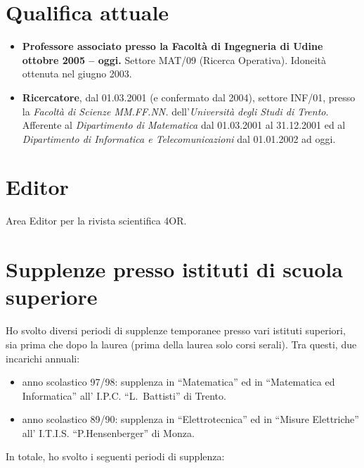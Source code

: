 \documentclass[11pt]{article}
\begin{document}
\section{Qualifica attuale}

\begin{itemize}
\item {\bf Professore associato presso la
          Facolt\`a di Ingegneria di Udine}
{\bf ottobre 2005 -- oggi.}
Settore MAT/09 (Ricerca Operativa).
Idoneit\`a ottenuta nel giugno 2003.


\item {\bf Ricercatore}, dal 01.03.2001 (e confermato dal 2004),
settore INF/01, presso la {\em Facolt\`a di Scienze MM.FF.NN.}
dell'{\em Universit\`a degli Studi di Trento}.
Afferente al {\em Dipartimento di Matematica} dal 01.03.2001 al
31.12.2001 ed al 
{\em Dipartimento di Informatica e Telecomunicazioni} dal 01.01.2002
ad oggi.

\end{itemize}


\section{Editor}

Area Editor per la rivista scientifica 4OR.


\section{Supplenze presso istituti di scuola superiore}

Ho svolto diversi periodi di supplenze temporanee
presso vari istituti superiori, sia prima che dopo la laurea
(prima della laurea solo corsi serali).
Tra questi, due incarichi annuali:
\begin{itemize}
   \item anno scolastico 97/98:
supplenza in ``Matematica'' ed in ``Matematica ed Informatica''
all' {{\sc I.P.C.} ``L.~Battisti''} 
di Trento.\\

   \vspace{-3.0mm}
   \item anno scolastico 89/90:
supplenza in ``Elettrotecnica'' ed in ``Misure Elettriche''
all' {{\sc I.T.I.S.} ``P.Hensenberger''}
di Monza.\\
\end{itemize} 

In totale,
ho svolto i seguenti periodi di supplenza:
\end{document}

